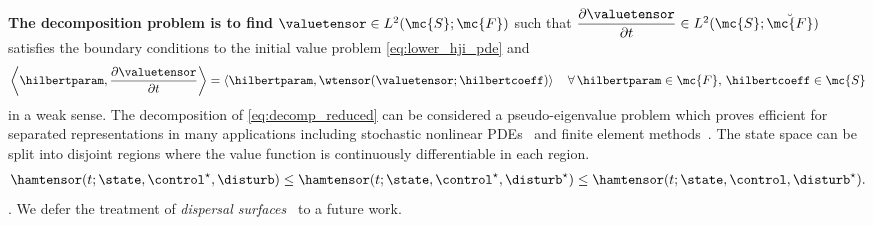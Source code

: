 \textbf{The decomposition problem is to find}
%
$\valuetensor \in L^2(\mc{S}; \mc{F})$ such that $\dfrac{\partial \valuetensor}{\partial t} \in L^2(\mc{S}; \breve{\mc{F}})$ satisfies the boundary conditions to the initial value problem \eqref{eq:lower_hji_pde} and 
%
\begin{align}
	\left\langle \hilbertparam, \dfrac{\partial \valuetensor}{\partial t} \right\rangle = \left\langle \hilbertparam, \wtensor(\valuetensor; \hilbertcoeff) \right\rangle \quad \forall \, \hilbertparam \in \mc{F}, \, \hilbertcoeff \in \mc{S}
	\label{eq:prob_statement}
\end{align}
%
in a weak sense. The decomposition of \eqref{eq:decomp_reduced} can be considered a pseudo-eigenvalue problem which proves efficient for separated representations in many applications including stochastic nonlinear PDEs~\cite{Nouy2009, LadevezeBook} and finite element methods~\cite{NouyFEM}. The state space can be split into disjoint regions where the value function is continuously differentiable in each region. 
%
\begin{align}
	\hamtensor(t; \state, \control^\star, \disturb) \le \hamtensor(t; \state, \control^\star, \disturb^\star) \le \hamtensor(t; \state, \control, \disturb^\star). 
	\label{eq:saddle_ham}
\end{align}
%
.
We defer the treatment of \textit{dispersal surfaces}~\cite{Isaacs1965} to a future work.

